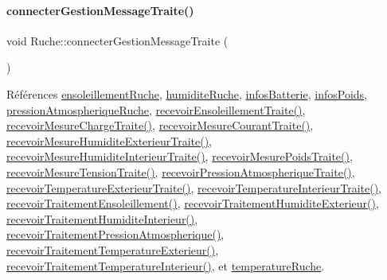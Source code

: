 \mbox{\label{class_ruche_a20ec8c6dc931218e5cf682050fe845d9}} 
\paragraph{\texorpdfstring{connecter\+Gestion\+Message\+Traite()}{connecterGestionMessageTraite()}}
{\footnotesize\ttfamily void Ruche\+::connecter\+Gestion\+Message\+Traite (\begin{DoxyParamCaption}{ }\end{DoxyParamCaption})\hspace{0.3cm}{\ttfamily [private]}}



Références \hyperlink{class_ruche_a197003ecff4f029885c7d38569a68d49}{ensoleillement\+Ruche}, \hyperlink{class_ruche_acb380928928e693a1933c4cf607ddf80}{humidite\+Ruche}, \hyperlink{class_ruche_af34340e456aff54c8d1ec433fdbe0740}{infos\+Batterie}, \hyperlink{class_ruche_af3d02b62dd3d986b73b38851bb88ec77}{infos\+Poids}, \hyperlink{class_ruche_a06efa82900dc7e31ed67c826d3157ae0}{pression\+Atmospherique\+Ruche}, \hyperlink{class_ruche_a581320fbd44c1752d10aa0e6e533863c}{recevoir\+Ensoleillement\+Traite()}, \hyperlink{class_ruche_a4ad540139115b79cd52336ad1a11453c}{recevoir\+Mesure\+Charge\+Traite()}, \hyperlink{class_ruche_a9e416457e8712d353580b7b242ef0836}{recevoir\+Mesure\+Courant\+Traite()}, \hyperlink{class_ruche_a2d19d8438eae55c1d76691398087f079}{recevoir\+Mesure\+Humidite\+Exterieur\+Traite()}, \hyperlink{class_ruche_aab8b4958b32aad9af790963903e4788e}{recevoir\+Mesure\+Humidite\+Interieur\+Traite()}, \hyperlink{class_ruche_afd8b0d7512f325327704cd3e37091dc2}{recevoir\+Mesure\+Poids\+Traite()}, \hyperlink{class_ruche_a65782ea2ee63003f2eae45e2530e3d5b}{recevoir\+Mesure\+Tension\+Traite()}, \hyperlink{class_ruche_a3b43ce547e616ee0b14e3a0e0aa44a4d}{recevoir\+Pression\+Atmospherique\+Traite()}, \hyperlink{class_ruche_a1d9b1d3aad20f206f27de4093b4a136f}{recevoir\+Temperature\+Exterieur\+Traite()}, \hyperlink{class_ruche_a3a5934e6da843c959f34aecef1217f92}{recevoir\+Temperature\+Interieur\+Traite()}, \hyperlink{class_ruche_a2ac5766ce8652084f034c498691488ea}{recevoir\+Traitement\+Ensoleillement()}, \hyperlink{class_ruche_a59e89246b484d7b63851c0ebd20af6c5}{recevoir\+Traitement\+Humidite\+Exterieur()}, \hyperlink{class_ruche_a6d4c59f2850f803a0ed1946e737b4262}{recevoir\+Traitement\+Humidite\+Interieur()}, \hyperlink{class_ruche_aa42daeffa023c83fde40072601e1fa39}{recevoir\+Traitement\+Pression\+Atmospherique()}, \hyperlink{class_ruche_a8482dda95a8a7888d5a60ea6f7d8729e}{recevoir\+Traitement\+Temperature\+Exterieur()}, \hyperlink{class_ruche_a2d2a681916140b977d45423d0d5d7b34}{recevoir\+Traitement\+Temperature\+Interieur()}, et \hyperlink{class_ruche_af721fb92f801a9b1f3ef3aa9867cf3de}{temperature\+Ruche}.



